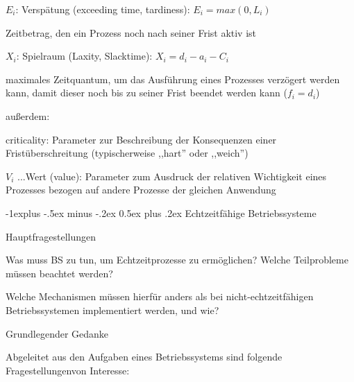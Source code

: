 \documentclass[a4paper]{article}
\makeatletter
\renewcommand{\subsection}{\@startsection{subsection}{2}{0mm}%
 {-1explus -.5ex minus -.2ex}%
 {0.5ex plus .2ex}%
 {\normalfont\normalsize\bfseries}}
\makeatother
\begin{document}
\begin{multicols}{3}
\begin{itemize*}
\begin{itemize*}
        \end{itemize*}
        \item
        $E_i$: Verspätung (exceeding time, tardiness): $E_i= max(0,
            L_i)$
        \begin{itemize*}
            \item Zeitbetrag, den ein Prozess noch nach seiner Frist aktiv ist
        \end{itemize*}
        \item
        \item
        $X_i$: Spielraum (Laxity, Slacktime): $X_i = d_i - a_i - C_i$
        \begin{itemize*}
            \item maximales Zeitquantum, um das Ausführung eines Prozesses verzögert werden kann, damit dieser noch bis zu seiner Frist beendet werden kann ($f_i=d_i$)
        \end{itemize*}
        \item
        außerdem:
        \begin{itemize*}
            \item criticality: Parameter zur Beschreibung der Konsequenzen einer Fristüberschreitung (typischerweise ,,hart'' oder ,,weich'')
            \item $V_i$ ...Wert (value): Parameter zum Ausdruck der relativen Wichtigkeit eines Prozesses bezogen auf andere Prozesse der gleichen Anwendung
        \end{itemize*}
    \end{itemize*}


    \subsection{Echtzeitfähige
        Betriebssysteme}

    \begin{itemize*}
        \item
        Hauptfragestellungen
        \begin{enumerate*}

            \item Was muss BS zu tun, um Echtzeitprozesse zu ermöglichen? Welche Teilprobleme müssen beachtet werden?
            \item Welche Mechanismen müssen hierfür anders als bei nicht-echtzeitfähigen Betriebssystemen implementiert werden, und wie?
        \end{enumerate*}
        \item
        Grundlegender Gedanke
        \begin{itemize*}
            \item Abgeleitet aus den Aufgaben eines Betriebssystems sind folgende Fragestellungenvon Interesse:
        \end{itemize*}
        \begin{enumerate*}


\end{enumerate*}
\end{itemize*}
\end{multicols}
\end{document}
